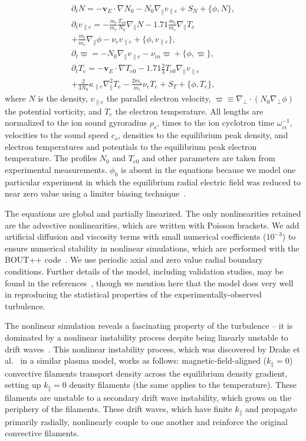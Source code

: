\documentclass[letter,scriptaddress,twocolumn, prl,showkeys]{revtex4}
\def\beqar{\begin{eqnarray}}
\def\eeqar{\end{eqnarray}}
\def\para{\parallel}
\newcommand{\pdt}{\partial_t}
\def\grad{\nabla}
\newcommand{\gradpar}{\grad_\parallel}
\newcommand{\gradperp}{\grad_\perp}
\newcommand{\vpe}{v_{\parallel e}}
\newcommand{\nue}{\nu_{e}}
\newcommand{\nuin}{\nu_{in}}
\newcommand{\kpe}{\kappa_{\parallel e}}
\newcommand{\fmie}{\frac{m_i}{m_e}}
\begin{document}
\beqar
\label{ni_eq}
\pdt N = - {\mathbf v_E} \cdot \grad N_0 - N_0 \gradpar \vpe + S_N + \{\phi,N\}, \\
\label{ve_eq}
\pdt \vpe = - \fmie \frac{T_{e0}}{N_0} \gradpar N - 1.71 \fmie \gradpar T_e  \nonumber \\
+ \fmie \gradpar \phi - \nue \vpe + \{\phi,\vpe \}, \\
\label{rho_eq}
\pdt \varpi = - N_0 \gradpar \vpe  - \nuin \varpi + \{\phi,\varpi \}, \\
\label{te_eq}
\pdt T_e = - {\mathbf v_E} \cdot \grad T_{e0} - 1.71 \frac{2}{3} T_{e0} \gradpar \vpe \nonumber \\
+ \frac{2}{3 N_0} \kpe \gradpar^2 T_e  - \frac{2 m_e}{m_i} \nue T_e  +  S_T + \{\phi,T_e\},
\eeqar
where $N$ is the density, $\vpe$ the parallel electron velocity, $\varpi \equiv \gradperp \cdot (N_0 \gradperp \phi)$ the potential vorticity,
and $T_e$ the electron temperature. All lengths are
normalized to the ion sound gyroradius $\rho_s$, times to the ion cyclotron time $\omega_{ci}^{-1}$, velocities to the sound speed $c_s$, densities to the equilibrium peak density, and electron
temperatures and potentials to the equilibrium peak electron temperature. The profiles $N_0$ and $T_{e0}$ and other parameters are taken from experimental measurements. $\phi_0$ 
is absent in the equations because we model one particular experiment in which the equilibrium radial electric field was reduced to near zero value using a
limiter biasing technique~\cite{schaffner2012}. 

The equations are global and partially linearized. The only nonlinearities retained are the advective nonlinearities, which are written with Poisson brackets. 
We add artificial diffusion and viscosity terms with small numerical coefficients ($10^{-3}$)
to ensure numerical stability in nonlinear simulations, which are performed with the BOUT++ code~\cite{dudson2009}. We use periodic axial and zero value radial 
boundary conditions. Further details of the model, including validation studies, may be found in the references~\cite{Popovich2010a,Popovich2010b,Umansky2011,friedman2012b,friedman2013},
though we mention here that the model does very well in reproducing
the statistical properties of the experimentally-observed turbulence.

The nonlinear simulation reveals a fascinating property of the turbulence -- it is dominated by a nonlinear instability process despite being linearly unstable to drift waves~\cite{friedman2012b,friedman2013}.
This nonlinear instability process, which was discovered by Drake et al.~\cite{drake1995} in a similar plasma model, works as follows: 
magnetic-field-aligned ($k_\para=0$) convective filaments transport density across the equilibrium density gradient, setting up $k_\para=0$ density filaments (the same applies to the temperature). 
These filaments are unstable to a secondary drift wave instability,
which grows on the periphery of the filaments. 
These drift waves, which have finite $k_\para$ and propagate primarily
radially, nonlinearly couple to one another and reinforce the original
convective filaments.
\end{document}
